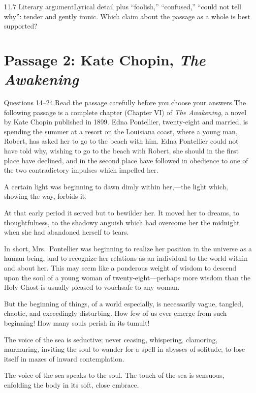\documentclass[11pt]{article}
\begin{document}
\begin{q}{1}{1.7 Literary argument}{Lyrical detail plus ``foolish,'' ``confused,'' ``could not tell why'': tender and gently ironic.}
Which claim about the passage as a whole is best supported?
\end{q}

\section{Passage 2: Kate Chopin, \emph{The Awakening}}

\begin{passage}{Questions 14--24.\quad Read the passage carefully before you choose your answers.}{The following passage is a complete chapter (Chapter VI) of \emph{The Awakening}, a novel by Kate Chopin published in 1899. Edna Pontellier, twenty-eight and married, is spending the summer at a resort on the Louisiana coast, where a young man, Robert, has asked her to go to the beach with him.}
\pp Edna Pontellier could not have told why, wishing to go to the beach with Robert, she should in the first place have declined, and in the second place have followed in obedience to one of the two contradictory impulses which impelled her.

\pp A certain light was beginning to dawn dimly within her,---the light which, showing the way, forbids it.

\pp At that early period it served but to bewilder her. It moved her to dreams, to thoughtfulness, to the shadowy anguish which had overcome her the midnight when she had abandoned herself to tears.

\pp In short, Mrs.\ Pontellier was beginning to realize her position in the universe as a human being, and to recognize her relations as an individual to the world within and about her. This may seem like a ponderous weight of wisdom to descend upon the soul of a young woman of twenty-eight---perhaps more wisdom than the Holy Ghost is usually pleased to vouchsafe to any woman.

\pp But the beginning of things, of a world especially, is necessarily vague, tangled, chaotic, and exceedingly disturbing. How few of us ever emerge from such beginning! How many souls perish in its tumult!

\pp The voice of the sea is seductive; never ceasing, whispering, clamoring, murmuring, inviting the soul to wander for a spell in abysses of solitude; to lose itself in mazes of inward contemplation.

\pp The voice of the sea speaks to the soul. The touch of the sea is sensuous, enfolding the body in its soft, close embrace.
\end{passage}
\end{document}
